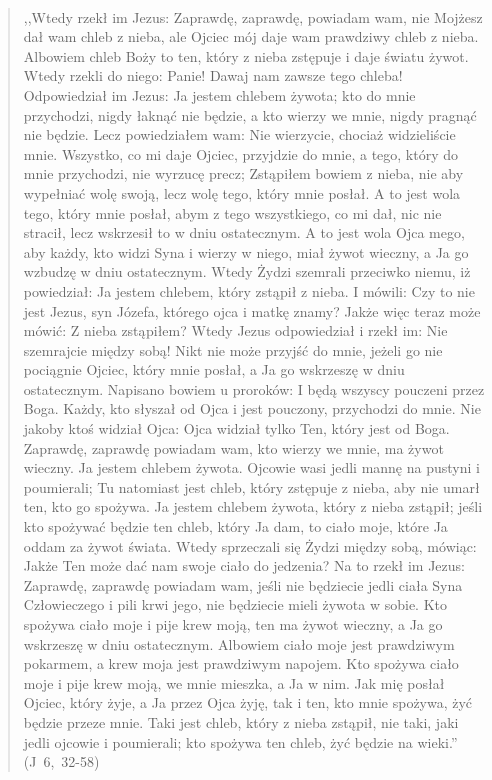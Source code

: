 \documentclass[10pt,a4paper,oneside]{article}
\begin{document}
\paragraph{}
\begin{quote}
,,Wtedy rzekł im Jezus: Zaprawdę, zaprawdę, powiadam wam, nie Mojżesz dał wam chleb z nieba, ale Ojciec mój daje wam prawdziwy chleb z nieba. Albowiem chleb Boży to ten, który z nieba zstępuje i daje światu żywot. Wtedy rzekli do niego: Panie! Dawaj nam zawsze tego chleba! Odpowiedział im Jezus: Ja jestem chlebem żywota; kto do mnie przychodzi, nigdy łaknąć nie będzie, a kto wierzy we mnie, nigdy pragnąć nie będzie. Lecz powiedziałem wam: Nie wierzycie, chociaż widzieliście mnie. Wszystko, co mi daje Ojciec, przyjdzie do mnie, a tego, który do mnie przychodzi, nie wyrzucę precz; Zstąpiłem bowiem z nieba, nie aby wypełniać wolę swoją, lecz wolę tego, który mnie posłał. A to jest wola tego, który mnie posłał, abym z tego wszystkiego, co mi dał, nic nie stracił, lecz wskrzesił to w dniu ostatecznym. A to jest wola Ojca mego, aby każdy, kto widzi Syna i wierzy w niego, miał żywot wieczny, a Ja go wzbudzę w dniu ostatecznym. Wtedy Żydzi szemrali przeciwko niemu, iż powiedział: Ja jestem chlebem, który zstąpił z nieba. I mówili: Czy to nie jest Jezus, syn Józefa, którego ojca i matkę znamy? Jakże więc teraz może mówić: Z nieba zstąpiłem? Wtedy Jezus odpowiedział i rzekł im: Nie szemrajcie między sobą! Nikt nie może przyjść do mnie, jeżeli go nie pociągnie Ojciec, który mnie posłał, a Ja go wskrzeszę w dniu ostatecznym. Napisano bowiem u proroków: I będą wszyscy pouczeni przez Boga. Każdy, kto słyszał od Ojca i jest pouczony, przychodzi do mnie. Nie jakoby ktoś widział Ojca: Ojca widział tylko Ten, który jest od Boga. Zaprawdę, zaprawdę powiadam wam, kto wierzy we mnie, ma żywot wieczny. Ja jestem chlebem żywota. Ojcowie wasi jedli mannę na pustyni i poumierali; Tu natomiast jest chleb, który zstępuje z nieba, aby nie umarł ten, kto go spożywa. Ja jestem chlebem żywota, który z nieba zstąpił; jeśli kto spożywać będzie ten chleb, który Ja dam, to ciało moje, które Ja oddam za żywot świata. Wtedy sprzeczali się Żydzi między sobą, mówiąc: Jakże Ten może dać nam swoje ciało do jedzenia? Na to rzekł im Jezus: Zaprawdę, zaprawdę powiadam wam, jeśli nie będziecie jedli ciała Syna Człowieczego i pili krwi jego, nie będziecie mieli żywota w sobie. Kto spożywa ciało moje i pije krew moją, ten ma żywot wieczny, a Ja go wskrzeszę w dniu ostatecznym. Albowiem ciało moje jest prawdziwym pokarmem, a krew moja jest prawdziwym napojem. Kto spożywa ciało moje i pije krew moją, we mnie mieszka, a Ja w nim. Jak mię posłał Ojciec, który żyje, a Ja przez Ojca żyję, tak i ten, kto mnie spożywa, żyć będzie przeze mnie. Taki jest chleb, który z nieba zstąpił, nie taki, jaki jedli ojcowie i poumierali; kto spożywa ten chleb, żyć będzie na wieki.'' \mbox{(J 6, 32-58)}
\end{quote}
\end{document}
